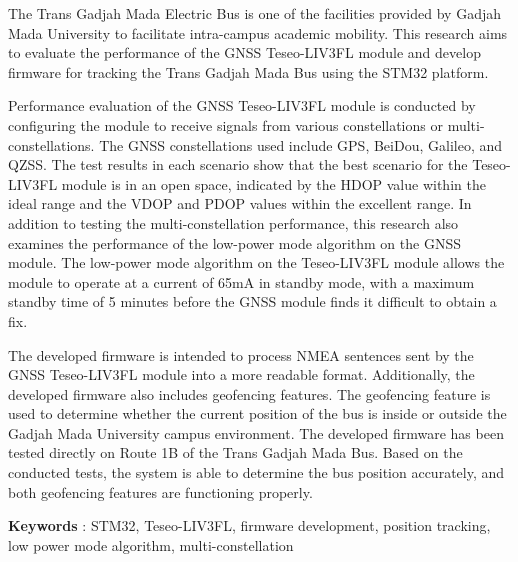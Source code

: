 The Trans Gadjah Mada Electric Bus is one of the facilities provided by Gadjah Mada University to facilitate intra-campus academic mobility. This research aims to evaluate the performance of the GNSS Teseo-LIV3FL module and develop firmware for tracking the Trans Gadjah Mada Bus using the STM32 platform.

Performance evaluation of the GNSS Teseo-LIV3FL module is conducted by configuring the module to receive signals from various constellations or multi-constellations. The GNSS constellations used include GPS, BeiDou, Galileo, and QZSS. The test results in each scenario show that the best scenario for the Teseo-LIV3FL module is in an open space, indicated by the HDOP value within the ideal range and the VDOP and PDOP values within the excellent range. In addition to testing the multi-constellation performance, this research also examines the performance of the low-power mode algorithm on the GNSS module. The low-power mode algorithm on the Teseo-LIV3FL module allows the module to operate at a current of 65mA in standby mode, with a maximum standby time of 5 minutes before the GNSS module finds it difficult to obtain a fix.

The developed firmware is intended to process NMEA sentences sent by the GNSS Teseo-LIV3FL module into a more readable format. Additionally, the developed firmware also includes geofencing features. The geofencing feature is used to determine whether the current position of the bus is inside or outside the Gadjah Mada University campus environment. The developed firmware has been tested directly on Route 1B of the Trans Gadjah Mada Bus. Based on the conducted tests, the system is able to determine the bus position accurately, and both geofencing features are functioning properly.

\noindent\textbf{Keywords} : STM32, Teseo-LIV3FL, firmware development, position tracking, low power mode algorithm, multi-constellation